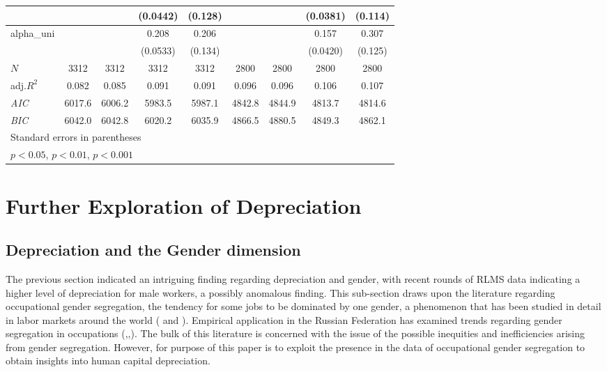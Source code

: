 \documentclass[alpha-refs]{wiley-article-02b}
\begin{document}
\begin{table}[htbp!]
\begin{tabular}{l*{8}{c}}
		&&&(0.0442)&(0.128)&&&(0.0381)&(0.114)\\
		\hline
		alpha\_uni&&&0.208\sym{***}&0.206&&&0.157\sym{***}&0.307\sym{*}\\
		&&&(0.0533)&(0.134)&&&(0.0420)&(0.125)\\
		\hline
		\(N\)&3312&3312&3312&3312&2800&2800&2800&2800\\
		adj.\(R^{2}\)&0.082&0.085&0.091&0.091&0.096&0.096&0.106&0.107\\
		\textit{AIC}&6017.6&6006.2&5983.5&5987.1&4842.8&4844.9&4813.7&4814.6\\
		\textit{BIC}&6042.0&6042.8&6020.2&6035.9&4866.5&4880.5&4849.3&4862.1\\
		\bottomrule
		\multicolumn{9}{l}{\footnotesize Standard errors in parentheses}\\
		\multicolumn{9}{l}{\footnotesize \sym{*} \(p<0.05\), \sym{**} \(p<0.01\), \sym{***} \(p<0.001\)}\\
	\end{tabular}
\end{table}


\section{Further Exploration of Depreciation}
\subsection{Depreciation and the Gender dimension}

The previous section indicated an intriguing finding regarding depreciation 
and gender, with recent rounds of RLMS data indicating a higher level of 
depreciation for male workers, a possibly anomalous finding. This 
sub-section draws upon the literature regarding occupational gender 
segregation, the tendency for some jobs to be dominated by one gender, a 
phenomenon that has been studied in detail in labor markets around the 
world (\citet{Preston_1999} and \citet{Blau_2013}). Empirical application 
in the Russian Federation has examined trends regarding gender segregation 
in occupations 
(\citet{Klimova_2009},\citet{Klimova_2012},\citet{Kosyakova_2015}). The 
bulk of this literature is concerned with the issue of the possible 
inequities and inefficiencies arising from gender segregation. However, for 
purpose of this paper is to exploit the presence in the data of 
occupational gender segregation to obtain insights into human capital 
depreciation.
\end{document}

